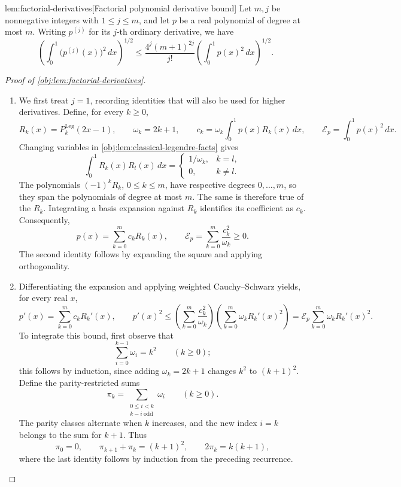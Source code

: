 \documentclass[11pt]{article}
\begin{document}
\begin{lemmav}{lem:factorial-derivatives}[Factorial polynomial derivative bound]
Let \(m,j\) be nonnegative integers with \(1\le j\le m\), and let \(p\) be a real polynomial of degree at most \(m\). Writing \(p^{(j)}\) for its \(j\)-th ordinary derivative, we have
\[
\left(\int_0^1 \bigl(p^{(j)}(x)\bigr)^2\,dx\right)^{1/2}
\le
\frac{4^j(m+1)^{2j}}{j!}
\left(\int_0^1 p(x)^2\,dx\right)^{1/2}.
\]
\end{lemmav}

\begin{proof}[Proof of \cref{obj:lem:factorial-derivatives}]
\begin{enumerate}
\item We first treat \(j=1\), recording identities that will also be used for higher derivatives. Define, for every \(k\ge0\),
\[
R_k(x)=P_k^{\mathrm{Leg}}(2x-1),\qquad
\omega_k=2k+1,\qquad
c_k=\omega_k\int_0^1 p(x)R_k(x)\,dx,
\qquad
\mathcal E_p=\int_0^1 p(x)^2\,dx.
\]
Changing variables in \cref{obj:lem:classical-legendre-facts} gives
\[
\int_0^1 R_k(x)R_l(x)\,dx
=
\begin{cases}
1/\omega_k,&k=l,\\
0,&k\ne l.
\end{cases}
\]
The polynomials \((-1)^kR_k\), \(0\le k\le m\), have respective degrees \(0,\ldots,m\), so they span the polynomials of degree at most \(m\). The same is therefore true of the \(R_k\). Integrating a basis expansion against \(R_k\) identifies its coefficient as \(c_k\). Consequently,
\[
p(x)=\sum_{k=0}^m c_kR_k(x),
\qquad
\mathcal E_p=\sum_{k=0}^m\frac{c_k^2}{\omega_k}\ge0.
\]
The second identity follows by expanding the square and applying orthogonality.

\item Differentiating the expansion and applying weighted Cauchy--Schwarz yields, for every real \(x\),
\[
p'(x)=\sum_{k=0}^m c_kR_k'(x),
\qquad
p'(x)^2
\le
\left(\sum_{k=0}^m\frac{c_k^2}{\omega_k}\right)
\left(\sum_{k=0}^m\omega_kR_k'(x)^2\right)
=
\mathcal E_p\sum_{k=0}^m\omega_kR_k'(x)^2.
\]
To integrate this bound, first observe that
\[
\sum_{i=0}^{k-1}\omega_i=k^2\qquad(k\ge0);
\]
this follows by induction, since adding \(\omega_k=2k+1\) changes \(k^2\) to \((k+1)^2\). Define the parity-restricted sums
\[
\pi_k=\sum_{\substack{0\le i<k\\k-i\ \mathrm{odd}}}\omega_i
\qquad(k\ge0).
\]
The parity classes alternate when \(k\) increases, and the new index \(i=k\) belongs to the sum for \(k+1\). Thus
\[
\pi_0=0,\qquad
\pi_{k+1}+\pi_k=(k+1)^2,
\qquad
2\pi_k=k(k+1),
\]
where the last identity follows by induction from the preceding recurrence.


\end{enumerate}
\end{proof}
\end{document}
